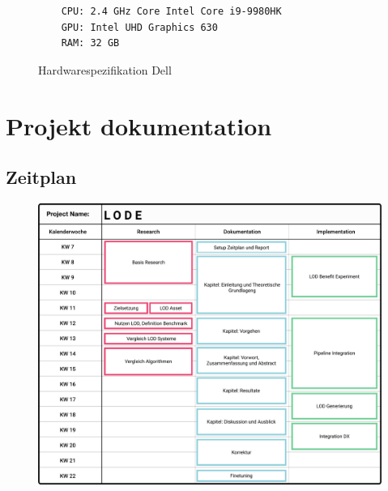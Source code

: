 \begin{figure}[H]
  \begin{lstlisting}
    CPU: 2.4 GHz Core Intel Core i9-9980HK
    GPU: Intel UHD Graphics 630
    RAM: 32 GB
  \end{lstlisting}
\caption{Hardwarespezifikation Dell}
\label{fig:windowsSpecification}
\end{figure}

\section{Projekt dokumentation}
\subsection{Zeitplan}
\begin{figure}[H]
  \centering
  \includegraphics[width=1\columnwidth]{../ressources/zeitplan.png}
\end{figure}
